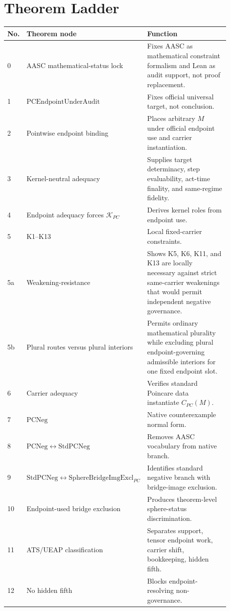 \documentclass[11pt]{article}
\newcommand{\CarrierPC}{C_{PC}}
\newcommand{\KPC}{\mathcal{K}_{PC}}
\newcommand{\PCEndpoint}{\mathrm{PCEndpointUnderAudit}}
\newcommand{\PCNeg}{\mathrm{PCNeg}}
\newcommand{\StdPCNeg}{\mathrm{StdPCNeg}}
\newcommand{\SphereBridgeImgExcl}{\mathrm{SphereBridgeImgExcl}_{PC}}
\begin{document}
\appendix

\section{Theorem Ladder}
\begin{longtable}{L{0.08\linewidth}L{0.42\linewidth}L{0.40\linewidth}}
\toprule
\textbf{No.} & \textbf{Theorem node} & \textbf{Function}\\
 & AASC mathematical-status lock & Fixes AASC as mathematical constraint formalism and Lean as audit support, not proof replacement.\\
1 & \(\PCEndpoint\) & Fixes official universal target, not conclusion.\\
2 & Pointwise endpoint binding & Places arbitrary \(M\) under official endpoint use and carrier instantiation.\\
3 & Kernel-neutral adequacy & Supplies target determinacy, step evaluability, act-time finality, and same-regime fidelity.\\
4 & Endpoint adequacy forces \(\KPC\) & Derives kernel roles from endpoint use.\\
5 & K1--K13 & Local fixed-carrier constraints.\\
5a & Weakening-resistance & Shows K5, K6, K11, and K13 are locally necessary against strict same-carrier weakenings that would permit independent negative governance.\\
5b & Plural routes versus plural interiors & Permits ordinary mathematical plurality while excluding plural endpoint-governing admissible interiors for one fixed endpoint slot.\\
6 & Carrier adequacy & Verifies standard Poincare data instantiate \(\CarrierPC(M)\).\\
7 & \(\PCNeg\) & Native counterexample normal form.\\
8 & \(\PCNeg\leftrightarrow\StdPCNeg\) & Removes AASC vocabulary from native branch.\\
9 & \(\StdPCNeg\leftrightarrow\SphereBridgeImgExcl\) & Identifies standard negative branch with bridge-image exclusion.\\
10 & Endpoint-used bridge exclusion & Produces theorem-level sphere-status discrimination.\\
11 & ATS/UEAP classification & Separates support, tensor endpoint work, carrier shift, bookkeeping, hidden fifth.\\
12 & No hidden fifth & Blocks endpoint-resolving non-governance.\\

\end{longtable}
\end{document}
